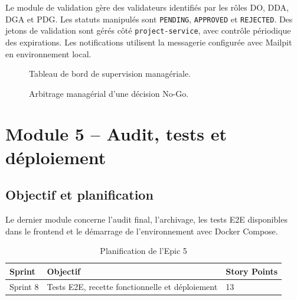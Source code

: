 Le module de validation gère des validateurs identifiés par les rôles DO, DDA, DGA et PDG. Les statuts manipulés sont \texttt{PENDING}, \texttt{APPROVED} et \texttt{REJECTED}. Des jetons de validation sont gérés côté \texttt{project-service}, avec contrôle périodique des expirations. Les notifications utilisent la messagerie configurée avec Mailpit en environnement local.

\begin{figure}[H]
\centering
\caption{Tableau de bord de supervision managériale.}
\label{fig:manager-dashboard}
\end{figure}

\begin{figure}[H]
\centering
\caption{Arbitrage managérial d’une décision No-Go.}
\label{fig:force-go}
\end{figure}

\section{Module 5 -- Audit, tests et déploiement}

\subsection{Objectif et planification}

Le dernier module concerne l’audit final, l’archivage, les tests E2E disponibles dans le frontend et le démarrage de l’environnement avec Docker Compose.

\begin{table}[H]
\centering
\caption{Planification de l’Epic 5}
\begin{tabular}{lll}
\toprule
\textbf{Sprint} & \textbf{Objectif} & \textbf{Story Points} \\
\midrule
Sprint 8 & Tests E2E, recette fonctionnelle et déploiement & 13 \\
\bottomrule
\end{tabular}
\end{table}

